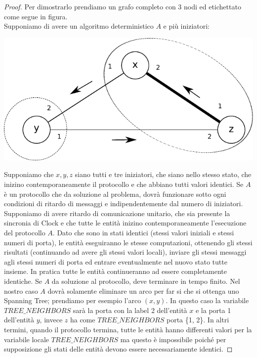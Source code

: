 \begin{proof}
    Per dimostrarlo prendiamo un grafo completo con 3 nodi ed etichettato come
    segue in figura.\\
    Supponiamo di avere un algoritmo deterministico $A$ e più iniziatori:
    \begin{center}
        \includegraphics[scale=0.8]{capitoli/costruzione-spanning-tree/imgs/n_37}
    \end{center}

    Supponiamo che $x, y, z$ siano tutti e tre iniziatori, che siano nello
    stesso stato, che inizino contemporaneamente il protocollo e che abbiano
    tutti valori identici. Se $A$ è un protocollo che da soluzione al problema,
    dovrà funzionare sotto ogni condizioni di ritardo di messaggi e
    indipendentemente dal numero di iniziatori. Supponiamo di avere ritardo di
    comunicazione unitario, che sia presente la sincronia di Clock e che tutte
    le entità inizino contemporaneamente l'esecuzione del protocollo $A$. Dato
    che sono in stati identici (stessi valori iniziali e stessi numeri di
    porta), le entità eseguiranno le stesse computazioni, ottenendo gli stessi
    risultati (continuando ad avere gli stessi valori locali), inviare gli
    stessi messaggi agli stessi numeri di porta ed entrare eventualmente nel
    nuovo stato tutte insieme. In pratica tutte le entità continueranno ad
    essere completamente identiche. Se $A$ da soluzione al protocollo, deve
    terminare in tempo finito. Nel nostro caso $A$ dovrà solamente eliminare un
    arco per far si che si ottenga uno Spanning Tree; prendiamo per esempio
    l'arco $(x,y)$. In questo caso la variabile $TREE\_NEIGHBORS$ sarà la porta
    con la label 2 dell'entità $x$ e la porta 1 dell'entità $y$, invece $z$ ha come
    $TREE\_NEIGHBORS$ porta \{1, 2\}. In altri termini, quando il protocollo
    termina, tutte le entità hanno differenti valori per la variabile locale
    $TREE\_NEIGHBORS$ ma questo è impossibile poiché per supposizione gli stati
    delle entità devono essere necessariamente identici.


\end{proof}

